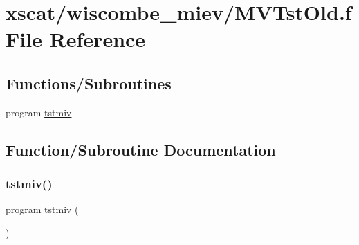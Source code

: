 \hypertarget{_m_v_tst_old_8f}{}\section{xscat/wiscombe\+\_\+miev/\+M\+V\+Tst\+Old.f File Reference}
\label{_m_v_tst_old_8f}
\subsection*{Functions/\+Subroutines}
\begin{DoxyCompactItemize}
\item 
program \hyperlink{_m_v_tst_old_8f_ab6683fe995a7469367f168ff8d664f5e}{tstmiv}
\end{DoxyCompactItemize}


\subsection{Function/\+Subroutine Documentation}
\mbox{\label{_m_v_tst_old_8f_ab6683fe995a7469367f168ff8d664f5e}} 
\subsubsection{\texorpdfstring{tstmiv()}{tstmiv()}}
{\footnotesize\ttfamily program tstmiv (\begin{DoxyParamCaption}{ }\end{DoxyParamCaption})}

